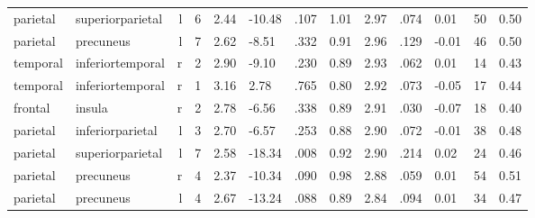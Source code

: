 \documentclass{article}
\begin{document}
\begin{longtable}{llrR{1.3cm}R{1cm}R{1.3cm}R{1cm}R{1cm}R{1.3cm}R{1cm}R{1.8cm}R{1.3cm}R{1.8cm}}
  parietal &          superiorparietal &    l &         6 &                  2.44 &           -10.48 &               .107 &                               1.01 &                          2.97 &                            .074 &   0.01 &     50 &      0.50 \\
  parietal &                 precuneus &    l &         7 &                  2.62 &            -8.51 &               .332 &                               0.91 &                          2.96 &                            .129 &  -0.01 &     46 &      0.50 \\
  temporal &          inferiortemporal &    r &         2 &                  2.90 &            -9.10 &               .230 &                               0.89 &                          2.93 &                            .062 &   0.01 &     14 &      0.43 \\
  temporal &          inferiortemporal &    r &         1 &                  3.16 &             2.78 &               .765 &                               0.80 &                          2.92 &                            .073 &  -0.05 &     17 &      0.44 \\
   frontal &                    insula &    r &         2 &                  2.78 &            -6.56 &               .338 &                               0.89 &                          2.91 &                            .030 &  -0.07 &     18 &      0.40 \\
  parietal &          inferiorparietal &    l &         3 &                  2.70 &            -6.57 &               .253 &                               0.88 &                          2.90 &                            .072 &  -0.01 &     38 &      0.48 \\
  parietal &          superiorparietal &    l &         7 &                  2.58 &           -18.34 &               .008 &                               0.92 &                          2.90 &                            .214 &   0.02 &     24 &      0.46 \\
  parietal &                 precuneus &    r &         4 &                  2.37 &           -10.34 &               .090 &                               0.98 &                          2.88 &                            .059 &   0.01 &     54 &      0.51 \\
  parietal &                 precuneus &    l &         4 &                  2.67 &           -13.24 &               .088 &                               0.89 &                          2.84 &                            .094 &   0.01 &     34 &      0.47 \\

\end{longtable}
\end{document}
